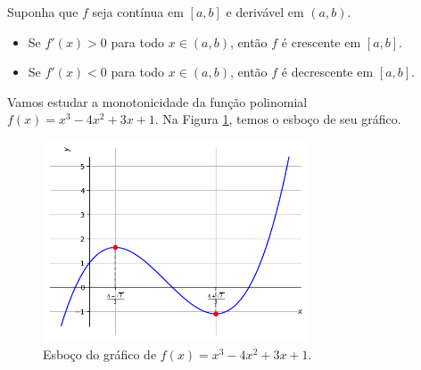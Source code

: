 \begin{corol}\label{corol:mono_deriv}
  Suponha que $f$ seja contínua em $[a,b]$ e derivável em $(a,b)$.
  \begin{itemize}
  \item Se $f'(x)>0$ para todo $x\in (a,b)$, então $f$ é crescente em $[a,b]$.
  \item Se $f'(x)<0$ para todo $x\in (a,b)$, então $f$ é decrescente em $[a,b]$.
  \end{itemize}
\end{corol}

\begin{ex}
  Vamos estudar a monotonicidade da função polinomial $f(x) = x^3 - 4x^2 + 3x + 1$. Na Figura \ref{fig:ex_corol_mono_deriv}, temos o esboço de seu gráfico.
  
  \begin{figure}[H]
    \centering
    \includegraphics[width=0.7\textwidth]{./cap_apderiv/dados/fig_ex_corol_mono_deriv/fig_ex_corol_mono_deriv}
    \caption{Esboço do gráfico de $f(x) = x^3 - 4x^2 + 3x + 1$.}
    \label{fig:ex_corol_mono_deriv}
  \end{figure}


\end{ex}
